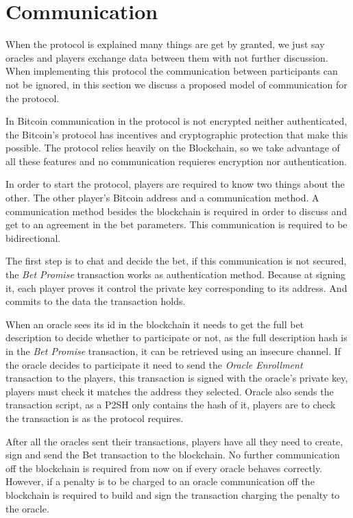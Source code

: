 \section{Communication}

When the protocol is explained many things are get by granted, we just say
  oracles and players exchange data between them with not further
  discussion.
When implementing this protocol the communication between participants can
  not be ignored, in this section we discuss a proposed model of communication
  for the protocol.

In Bitcoin communication in the protocol is not encrypted neither
  authenticated, the Bitcoin's protocol has incentives and cryptographic
  protection that make this possible.
The protocol relies heavily on the Blockchain, so we take advantage of all these
  features and no communication requieres encryption nor authentication.

In order to start the protocol, players are required to know two things about
the other. The other player's Bitcoin address and a communication method.
A communication method besides the blockchain is required in order to discuss
  and get to an agreement in the bet parameters.
This communication is required to be bidirectional.

The first step is to chat and decide the bet, if this communication is not
  secured, the \textit{Bet Promise} transaction works as authentication method.
Because at signing it, each player proves it control the private key
  corresponding to its address.
And commits to the data the transaction holds.

When an oracle sees its id in the blockchain it needs to get the full bet
  description to decide whether to participate or not, as the full description
  hash is in the \textit{Bet Promise} transaction, it can be retrieved using an
  insecure channel.
If the oracle decides to participate it need to send the \textit{Oracle
  Enrollment} transaction to the players, this transaction is signed with the
  oracle's private key, players must check it matches the address they selected.
Oracle also sends the transaction script, as a P2SH only contains the hash of
  it, players are to check the transaction is as the protocol requires.

After all the oracles sent their transactions, players have all they need
  to create, sign and send the Bet transaction to the blockchain.
No further communication off the blockchain is required from now on if every
  oracle behaves correctly.
However, if a penalty is to be charged to an oracle  communication off the blockchain is required to
  build and sign the transaction charging the penalty to the oracle.


